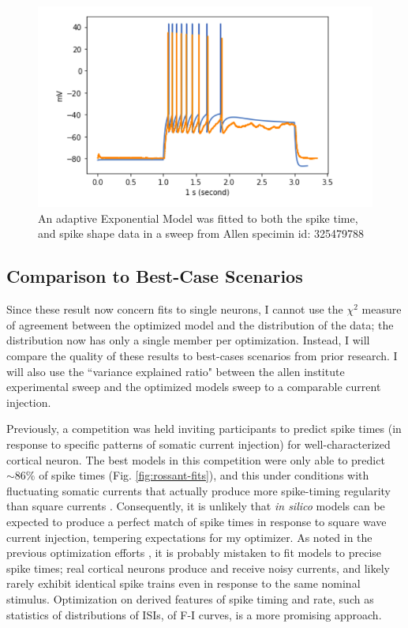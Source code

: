 \begin{figure}
    \centering
    \includegraphics[scale=1]{figures/adexp_fit_allen_specid_325479788.png}
    \caption[Optimized AdEx model from Allen Cell Types (C)]{ An adaptive Exponential Model was fitted to both the spike time, and spike shape data in a sweep from Allen specimin id: 325479788}
    \label{fig:specimen_325479788}
\end{figure}

\subsection{Comparison to Best-Case Scenarios}
Since these result now concern fits to single neurons, I cannot use the $\chi^2$ measure of agreement between the optimized model and the distribution of the data; the distribution now has only a single member per optimization.
Instead, I will compare the quality of these results to best-cases scenarios from prior research.
I will also use the ``variance explained ratio" between the allen institute experimental sweep and the optimized models sweep to a comparable current injection.

Previously, a competition was held \citep{naud} inviting participants to predict spike times (in response to specific patterns of somatic current injection) for well-characterized cortical neuron.
The best models in this competition were only able to predict $\sim86\%$ of spike times (Fig. \ref{fig:rossant-fits}), and this under conditions with fluctuating somatic currents that actually produce more spike-timing regularity than square currents \citep{mainen}.
Consequently, it is unlikely that \emph{in silico} models can be expected to produce a perfect match of spike times in response to square wave current injection, tempering expectations for my optimizer.
As noted in the previous optimization efforts \citep{druckmann2007novel}, it is probably mistaken to fit models to precise spike times; real cortical neurons produce and receive noisy currents, and likely rarely exhibit identical spike trains even in response to the same nominal stimulus.
Optimization on derived features of spike timing and rate, such as statistics of distributions of ISIs, of F-I curves, is a more promising approach.

